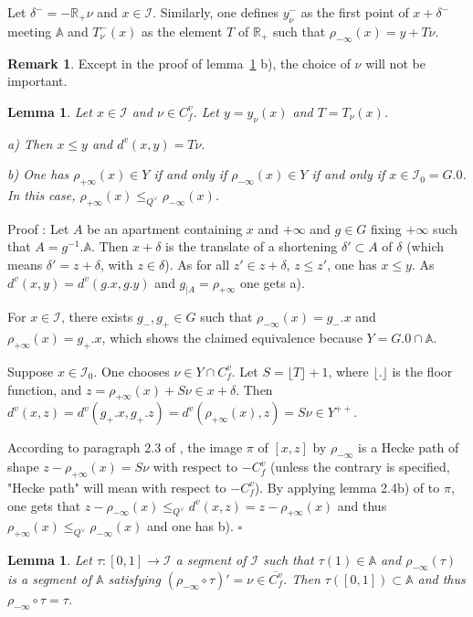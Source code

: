 \documentclass[12pt]{article}
\theoremstyle{plain}
\newtheorem{lemme}[thm]{Lemma}
\theoremstyle{definition}
\newtheorem{rque}[thm]{Remark}
\newcommand{\R}{\mathbb{R}}
\newcommand{\A}{\mathbb{A}}
\newcommand{\I}{\mathcal{I}}
\begin{document}
Let $\delta^-=-\R_+\nu$ and $x\in \I$. Similarly, one defines $y_\nu^-$ as the first point of $x+\delta^-$ meeting $\A$ and $T^-_\nu(x)$ as the element $T$ of $\R_+$ such that $\rho_{-\infty}(x)=y+T\nu$.

\begin{rque}
Except in the proof of lemma~\ref{lemme distance vectorielle} b), the choice of $\nu$ will not be important.
\end{rque}


\begin{lemme}\label{lemme distance vectorielle}
Let $x\in \mathcal{I}$ and $\nu\in C_f^v$. Let $y=y_\nu(x)$ and $T=T_\nu(x)$.

a)  Then $x\leq y$ and $d^v(x,y)=T\nu$.

b) One has $\rho_{+\infty}(x)\in Y$ if and only if $\rho_{-\infty}(x)\in Y$ if and only if $x\in \mathcal I_0=G.0$. In this case, $\rho_{+\infty}(x)\leq_{Q^\vee} \rho_{-\infty}(x)$.


\end{lemme}

Proof : Let $A$ be an apartment containing $x$ and $+\infty$ and $g\in G$ fixing $+\infty$ such that $A=g^{-1}.\A$. Then $x+\delta$ is the translate of a shortening $\delta'\subset A$ of $\delta$ (which means $\delta'=z+\delta$, with $z\in \delta$). As for all $z'\in z+\delta$, $z\leq z'$, one has $x\leq y$. As $d^v(x,y)=d^v(g.x,g.y)$ and $g_{|A}=\rho_{+\infty}$ one gets a).

For $x\in\mathcal{I}$, there exists $g_-,g_+\in G$ such that $\rho_{-\infty}(x)=g_-.x$ and $\rho_{+\infty}(x)=g_+.x$, which shows the claimed equivalence because $Y=G.0\cap \mathbb{A}$.

Suppose $x\in \mathcal{I}_0$. One chooses $\nu\in Y\cap C_f^v$. Let $S=\lfloor T\rfloor +1$, where $\lfloor.\rfloor$ is the floor function, and $z=\rho_{+\infty}(x)+S\nu\in x+\delta$. Then $d^v(x,z)=d^v(g_+.x,g_+.z)=d^v(\rho_{+\infty}(x),z)=S\nu\in Y^{++}$.

According to paragraph 2.3 of \cite{gaussent2014spherical}, the image $\pi$ of $[x,z]$ by $\rho_{-\infty}$ is a Hecke path of shape $z-\rho_{+\infty}(x)=S\nu$ with respect to $-C^v_f$ (unless the contrary is specified, "Hecke path" will mean with respect to $-C^v_f$). By applying lemma 2.4b) of \cite{gaussent2014spherical} to $\pi$, one gets that $z-\rho_{-\infty}(x)\leq _{Q^\vee} d^v(x,z)=z-\rho_{+\infty}(x)$ and thus $\rho_{+\infty}(x)\leq_{Q^\vee} \rho_{-\infty}(x)$ and one has b). $\square$


\begin{lemme}\label{lemme image réciproque de segments}
Let $\tau:[0,1]\rightarrow \mathcal{I}$ a segment of $\mathcal{I}$ such that $\tau(1)\in \mathbb{A}$ and $\rho_{-\infty}(\tau)$ is a segment of $\mathbb{A}$ satisfying  $(\rho_{-\infty}\circ\tau)'=\nu\in \overline{C^v_f}$. Then $\tau([0,1])\subset \mathbb{A}$ and thus $\rho_{-\infty}\circ \tau=\tau$.
\end{lemme}
\end{document}
